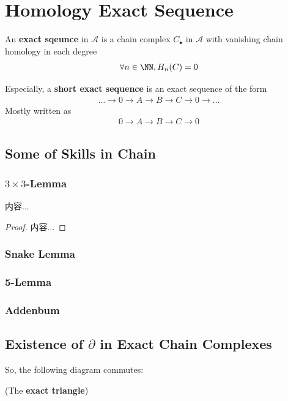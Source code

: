 \documentclass[Total.tex]{subfiles}
\begin{document}
		\section{Homology Exact Sequence}
			\begin{Def}
				An \textbf{exact sqeunce} in $\mathcal{A}$ is a chain complex $C_\bullet$ in $\mathcal{A}$ with vanishing chain homology in each degree
				\begin{gather*}
					\forall n\in \NN,H_n(C)=0
				\end{gather*}
				
				Especially, a \textbf{short exact sequence} is an exact sequence of the form
				\begin{gather*}
					\dots\rightarrow0\rightarrow A\rightarrow B\rightarrow C\rightarrow 0\rightarrow \dots
				\end{gather*}
				Mostly written as
				\begin{gather*}
					0\rightarrow A\rightarrow B\rightarrow C\rightarrow 0
				\end{gather*}
			\end{Def}
			\subsection{Some of Skills in Chain }
				\subsubsection{$3\times 3$-Lemma}
					\begin{proposition}
						内容...
					\end{proposition}
					\begin{proof}
						内容...
					\end{proof}
				\subsubsection{Snake Lemma}
				\subsubsection{5-Lemma}
				\subsubsection{Addenbum}
			\subsection{Existence of $\partial$ in Exact Chain Complexes}
			So, the following diagram commutes:
			\begin{center}
				\qquad(The \textbf{exact triangle})
			\end{center}
			
\end{document}
